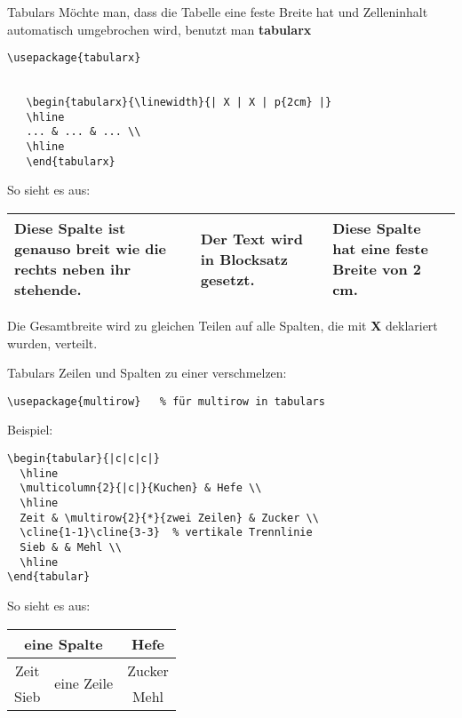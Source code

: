 \begin{frame}[fragile]{Tabulars}
Möchte man, dass die Tabelle eine feste Breite hat und Zelleninhalt automatisch umgebrochen wird, benutzt man \textbf{tabularx}
\begin{lstlisting}[style=tex]
\usepackage{tabularx}


   \begin{tabularx}{\linewidth}{| X | X | p{2cm} |}
   \hline
   ... & ... & ... \\
   \hline
   \end{tabularx}

\end{lstlisting}\pause

So sieht es aus:\vspace{3pt}
\begin{tabularx}{\linewidth}{| X | X | p{2cm} |}
\hline
Diese Spalte ist genauso breit wie die rechts neben ihr stehende. & Der Text wird in Blocksatz gesetzt.  & Diese Spalte hat eine feste Breite von 2\,cm. \\
\hline
\end{tabularx}

\bigskip
Die Gesamtbreite wird zu gleichen Teilen auf alle Spalten, die mit \textbf{X} deklariert wurden, verteilt.
\end{frame}

\begin{frame}[fragile]{Tabulars}
Zeilen und Spalten zu einer verschmelzen:

\begin{lstlisting}[style=tex]
\usepackage{multirow}   % für multirow in tabulars
\end{lstlisting}\pause

Beispiel:
\begin{lstlisting}[style=tex]
\begin{tabular}{|c|c|c|}
  \hline
  \multicolumn{2}{|c|}{Kuchen} & Hefe \\
  \hline
  Zeit & \multirow{2}{*}{zwei Zeilen} & Zucker \\
  \cline{1-1}\cline{3-3}  % vertikale Trennlinie
  Sieb & & Mehl \\
  \hline
\end{tabular}
\end{lstlisting}

So sieht es aus:
\renewcommand{\arraystretch}{1.2}
\begin{tabular}{|c|c|c|}
\hline
\multicolumn{2}{|c|}{eine Spalte} & Hefe \\
\hline
Zeit & \multirow{2}{*}{eine Zeile} & Zucker \\
\cline{1-1}\cline{3-3}
Sieb & & Mehl \\
\hline
\end{tabular}
\end{frame}

